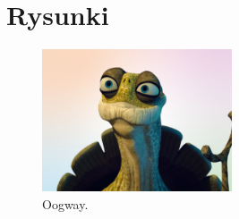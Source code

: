 \documentclass{article}
\begin{document}
\section{Rysunki}
\begin{figure}[h]
    \centering
    \includegraphics[width=0.5\textwidth]{rysunek1.png}
    \caption{Oogway.}
    \label{fig:rysunek1.png}
\end{figure}
\end{document}
